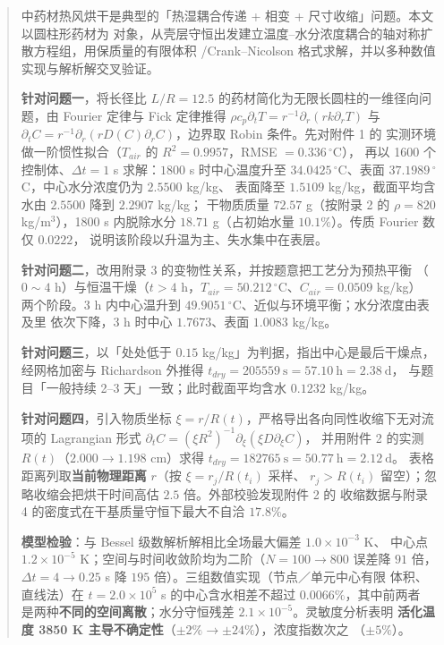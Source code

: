 
\begin{abstract}
中药材热风烘干是典型的「热湿耦合传递 + 相变 + 尺寸收缩」问题。本文以圆柱形药材为
对象，从壳层守恒出发建立温度--水分浓度耦合的轴对称扩散方程组，用保质量的有限体积
/Crank--Nicolson 格式求解，并以多种数值实现与解析解交叉验证。

\textbf{针对问题一}，将长径比 $L/R=12.5$ 的药材简化为无限长圆柱的一维径向问题，由
Fourier 定律与 Fick 定律推得
$\rho c_p\partial_tT=r^{-1}\partial_r(rk\partial_rT)$ 与
$\partial_tC=r^{-1}\partial_r(rD(C)\partial_rC)$，边界取 Robin 条件。先对附件 1 的
实测环境做一阶惯性拟合（$T_{air}$ 的 $R^2=0.9957$，RMSE $=0.336\,^\circ$C），
再以 1600 个控制体、$\Delta t=1$ s 求解：$1800$ s 时中心温度升至
$34.0425\,^\circ$C、表面 $37.1989\,^\circ$C，中心水分浓度仍为 $2.5500$ kg/kg、
表面降至 $1.5109$ kg/kg，截面平均含水由 $2.5500$ 降到 $2.2907$ kg/kg；
干物质质量 $72.57$ g（按附录 2 的 $\rho=820$ kg/m$^3$），1800 s 内脱除水分
$18.71$ g（占初始水量 $10.1\%$）。传质 Fourier 数仅 $0.0222$，
说明该阶段以升温为主、失水集中在表层。

\textbf{针对问题二}，改用附录 3 的变物性关系，并按题意把工艺分为预热平衡
（$0\sim4$ h）与恒温干燥（$t>4$ h，$T_{air}=50.212\,^\circ$C、$C_{air}=0.0509$ kg/kg）
两个阶段。3 h 内中心温升到 $49.9051\,^\circ$C、近似与环境平衡；水分浓度由表及里
依次下降，3 h 时中心 $1.7673$、表面 $1.0083$ kg/kg。

\textbf{针对问题三}，以「处处低于 $0.15$ kg/kg」为判据，指出中心是最后干燥点，
经网格加密与 Richardson 外推得
$\boxed{t_{dry}=205559\ \mathrm{s}=57.10\ \mathrm{h}=2.38\ \mathrm{d}}$，
与题目「一般持续 2--3 天」一致；此时截面平均含水 $0.1232$ kg/kg。

\textbf{针对问题四}，引入物质坐标 $\xi=r/R(t)$，严格导出各向同性收缩下无对流项的
Lagrangian 形式 $\partial_tC=(\xi R^2)^{-1}\partial_\xi(\xi D\partial_\xi C)$，
并用附件 2 的实测 $R(t)$（$2.000\to1.198$ cm）求得
$\boxed{t_{dry}=182765\ \mathrm{s}=50.77\ \mathrm{h}=2.12\ \mathrm{d}}$。
表格距离列取\textbf{当前物理距离} $r$（按 $\xi=r_j/R(t_i)$ 采样、
$r_j>R(t_i)$ 留空）；忽略收缩会把烘干时间高估 $2.5$ 倍。外部校验发现附件 2 的
收缩数据与附录 4 的密度式在干基质量守恒下最大不自洽 $17.8\%$。

\textbf{模型检验}：与 Bessel 级数解析解相比全场最大偏差 $1.0\times10^{-3}$ K、
中心点 $1.2\times10^{-5}$ K；空间与时间收敛阶均为二阶（$N=100\to800$ 误差降
$91$ 倍，$\Delta t=4\to0.25$ s 降 $195$ 倍）。三组数值实现（节点／单元中心有限
体积、直线法）在 $t=2.0\times10^5$ s 的中心含水相差不超过 $0.0066\%$，其中前两者
是两种\textbf{不同的空间离散}；水分守恒残差 $2.1\times10^{-5}$。灵敏度分析表明
\textbf{活化温度 3850 K 主导不确定性}（$\pm2\%\to\pm24\%$），浓度指数次之
（$\pm5\%$）。

\end{abstract}

